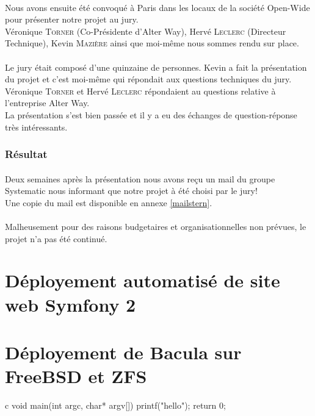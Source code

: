 \paragraph*{}
Nous avons ensuite été convoqué à Paris dans les locaux de la société Open-Wide pour présenter notre projet au jury.
\\
Véronique \textsc{Torner} (Co-Présidente d'Alter Way), Hervé \textsc{Leclerc} (Directeur Technique), Kevin \textsc{Mazière} ainsi que moi-même nous sommes rendu sur place.

\paragraph*{}
Le jury était composé d'une quinzaine de personnes. Kevin a fait la présentation du projet et c'est moi-même qui répondait aux questions techniques du jury. Véronique \textsc{Torner}
et Hervé \textsc{Leclerc} répondaient au questions relative à l'entreprise Alter Way.
\\
La présentation s'est bien passée et il y a eu des échanges de question-réponse très intéressants.


\subsubsection{Résultat}
\paragraph*{}
Deux semaines après la présentation nous avons reçu un mail du groupe Systematic nous informant que notre projet à été choisi par le jury!\\
Une copie du mail est disponible en annexe \ref{mailstern}.

\paragraph*{}
Malheusement pour des raisons budgetaires et organisationnelles non prévues, le projet n'a pas été continué.


\section{Déployement automatisé de site web Symfony 2}


\section{Déployement de Bacula sur FreeBSD et ZFS}


\begin{pygmented}{c}
void main(int argc, char* argv[])
{
	printf("hello");
	return 0;
}
\end{pygmented}






\cite{test}
